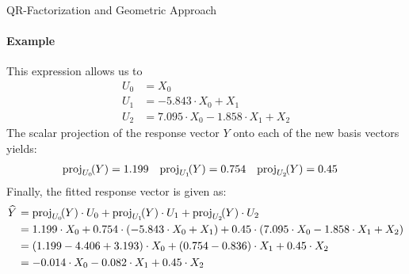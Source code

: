 \begin{frame}{QR-Factorization and Geometric Approach}
\framesubtitle{Example}
This expression allows us to
\begin{align*}
      U_0 & = X_0\\
      U_1 & = -5.843 \cdot X_0 + X_1\\
      U_2 & = 7.095 \cdot X_0 - 1.858 \cdot X_1 + X_2
\end{align*}
The scalar projection of the response vector $Y$ onto each of the new 
basis vectors yields:
\begin{align*}
   \operatorname{proj}_{U_0}\!(Y) & = 1.199 &
   \operatorname{proj}_{U_1}\!(Y) & = 0.754 &
   \operatorname{proj}_{U_2}\!(Y) & = 0.45 
\end{align*}
Finally, the fitted response vector is given as:
\begin{align*}
    \mkern 1.5mu\widehat{\mkern-1.5muY}\mkern 1.5mu & = \operatorname{proj}_{U_0}\!(Y) \cdot U_0 + \operatorname{proj}_{U_1}\!(Y) \cdot U_1 + 
    \operatorname{proj}_{U_2}\!(Y) \cdot U_2\\
        & = 1.199 \cdot X_0 + 0.754 \cdot (-5.843 \cdot X_0 + X_1) +
        0.45\cdot (7.095 \cdot X_0 - 1.858 \cdot X_1 + X_2)\\
        & = (1.199 - 4.406 + 3.193) \cdot X_0 + (0.754 - 0.836) \cdot
        X_1 + 0.45
        \cdot X_2\\
        & = -0.014 \cdot X_0 -0.082 \cdot X_1 + 0.45 \cdot X_2
\end{align*}
\end{frame}
%
%
